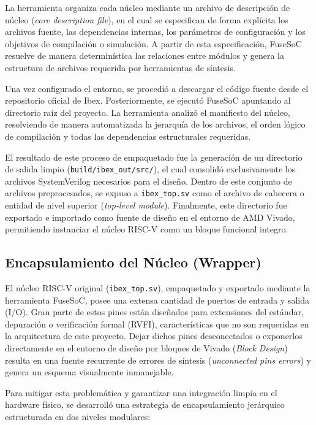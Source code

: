 La herramienta organiza cada núcleo mediante un archivo de descripción de núcleo (\textit{core description file}), en el cual se especifican de forma explícita los archivos fuente, las dependencias internas, los parámetros de configuración y los objetivos de compilación o simulación. A partir de esta especificación, FuseSoC resuelve de manera determinística las relaciones entre módulos y genera la estructura de archivos requerida por herramientas de síntesis.

Una vez configurado el entorno, se procedió a descargar el código fuente desde el repositorio oficial de Ibex. Posteriormente, se ejecutó FuseSoC apuntando al directorio raíz del proyecto. La herramienta analizó el manifiesto del núcleo, resolviendo de manera automatizada la jerarquía de los archivos, el orden lógico de compilación y todas las dependencias estructurales requeridas. 

El resultado de este proceso de empaquetado fue la generación de un directorio de salida limpio (\texttt{build/ibex\_out/src/}), el cual consolidó exclusivamente los archivos SystemVerilog necesarios para el diseño. Dentro de este conjunto de archivos preprocesados, se expuso a \texttt{ibex\_top.sv} como el archivo de cabecera o entidad de nivel superior (\textit{top-level module}). Finalmente, este directorio fue exportado e importado como fuente de diseño en el entorno de AMD Vivado, permitiendo instanciar el núcleo RISC-V como un bloque funcional integro.

\subsection{Encapsulamiento del Núcleo (Wrapper)}
\label{ssec:wrapper_ibex}

El núcleo RISC-V original (\texttt{ibex\_top.sv}), empaquetado y exportado mediante la herramienta FuseSoC, posee una extensa cantidad de puertos de entrada y salida (I/O). Gran parte de estos pines están diseñados para extensiones del estándar, depuración o verificación formal (RVFI), características que no son requeridas en la arquitectura de este proyecto. Dejar dichos pines desconectados o exponerlos directamente en el entorno de diseño por bloques de Vivado (\textit{Block Design}) resulta en una fuente recurrente de errores de síntesis (\textit{unconnected pins errors}) y genera un esquema visualmente inmanejable.

Para mitigar esta problemática y garantizar una integración limpia en el hardware físico, se desarrolló una estrategia de encapsulamiento jerárquico estructurada en dos niveles modulares:

